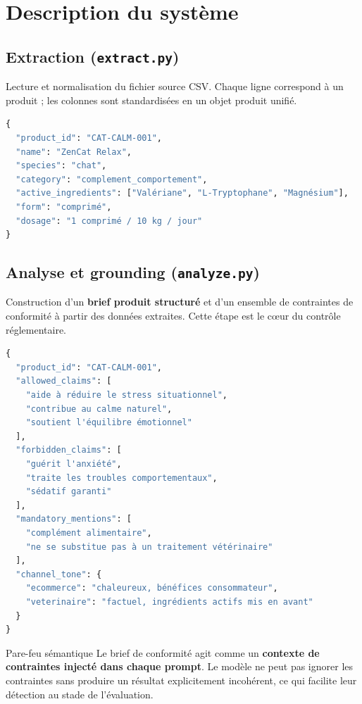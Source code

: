 \documentclass[11pt,a4paper]{article}
\begin{document}
\section{Description du système}

\subsection{Extraction (\texttt{extract.py})}

Lecture et normalisation du fichier source CSV. Chaque ligne correspond à un produit ;
les colonnes sont standardisées en un objet produit unifié.

\begin{lstlisting}[language=Python, caption={Exemple de sortie extract}]
{
  "product_id": "CAT-CALM-001",
  "name": "ZenCat Relax",
  "species": "chat",
  "category": "complement_comportement",
  "active_ingredients": ["Valériane", "L-Tryptophane", "Magnésium"],
  "form": "comprimé",
  "dosage": "1 comprimé / 10 kg / jour"
}
\end{lstlisting}

\subsection{Analyse et grounding (\texttt{analyze.py})}

Construction d'un \textbf{brief produit structuré} et d'un ensemble de contraintes de conformité
à partir des données extraites. Cette étape est le cœur du contrôle réglementaire.

\begin{lstlisting}[language=Python, caption={Brief de conformité produit}]
{
  "product_id": "CAT-CALM-001",
  "allowed_claims": [
    "aide à réduire le stress situationnel",
    "contribue au calme naturel",
    "soutient l'équilibre émotionnel"
  ],
  "forbidden_claims": [
    "guérit l'anxiété",
    "traite les troubles comportementaux",
    "sédatif garanti"
  ],
  "mandatory_mentions": [
    "complément alimentaire",
    "ne se substitue pas à un traitement vétérinaire"
  ],
  "channel_tone": {
    "ecommerce": "chaleureux, bénéfices consommateur",
    "veterinaire": "factuel, ingrédients actifs mis en avant"
  }
}
\end{lstlisting}

\begin{infobox}{Pare-feu sémantique}
Le brief de conformité agit comme un \textbf{contexte de contraintes injecté dans chaque prompt}.
Le modèle ne peut pas ignorer les contraintes sans produire un résultat explicitement incohérent,
ce qui facilite leur détection au stade de l'évaluation.
\end{infobox}
\end{document}
